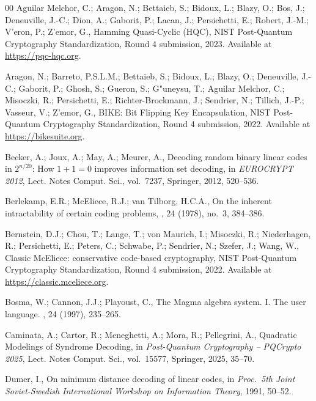 \documentclass{amsart}
\begin{document}
\begin{thebibliography}{00}
Aguilar Melchor, C.; Aragon, N.; Bettaieb, S.; Bidoux, L.; Blazy, O.; Bos, J.;
Deneuville, J.-C.; Dion, A.; Gaborit, P.; Lacan, J.; Persichetti, E.;
Robert, J.-M.; V'eron, P.; Z'emor, G.,
\newblock Hamming Quasi-Cyclic (HQC),
\newblock NIST Post-Quantum Cryptography Standardization, Round 4
submission, 2023.
\newblock Available at \url{https://pqc-hqc.org}.

Aragon, N.; Barreto, P.S.L.M.; Bettaieb, S.; Bidoux, L.; Blazy, O.;
Deneuville, J.-C.; Gaborit, P.; Ghosh, S.; Gueron, S.; G"uneysu, T.;
Aguilar Melchor, C.; Misoczki, R.; Persichetti, E.; Richter-Brockmann, J.;
Sendrier, N.; Tillich, J.-P.; Vasseur, V.; Z'emor, G.,
\newblock BIKE: Bit Flipping Key Encapsulation,
\newblock NIST Post-Quantum Cryptography Standardization, Round 4
submission, 2022.
\newblock Available at \url{https://bikesuite.org}.

Becker, A.; Joux, A.; May, A.; Meurer, A.,
\newblock Decoding random binary linear codes in $2^{n/20}$: How $1+1=0$
improves information set decoding,
\newblock in {\em EUROCRYPT 2012}, Lect. Notes Comput. Sci.,
vol.~7237, Springer, 2012, 520--536.

Berlekamp, E.R.; McEliece, R.J.; van Tilborg, H.C.A.,
\newblock On the inherent intractability of certain coding problems,
, 24 (1978), no.~3, 384--386.

Bernstein, D.J.; Chou, T.; Lange, T.; von Maurich, I.; Misoczki, R.;
Niederhagen, R.; Persichetti, E.; Peters, C.; Schwabe, P.; Sendrier, N.;
Szefer, J.; Wang, W.,
\newblock Classic McEliece: conservative code-based cryptography,
\newblock NIST Post-Quantum Cryptography Standardization, Round 4
submission, 2022.
\newblock Available at \url{https://classic.mceliece.org}.

Bosma, W.; Cannon, J.J.; Playoust, C.,
\newblock The Magma algebra system. I. The user language.
, 24 (1997), 235--265.

Caminata, A.; Cartor, R.; Meneghetti, A.; Mora, R.; Pellegrini, A.,
\newblock Quadratic Modelings of Syndrome Decoding,
\newblock in {\em Post-Quantum Cryptography -- PQCrypto 2025},
Lect. Notes Comput. Sci., vol.~15577, Springer, 2025, 35--70.

Dumer, I.,
\newblock On minimum distance decoding of linear codes,
\newblock in {\em Proc.\ 5th Joint Soviet-Swedish International Workshop on
Information Theory}, 1991, 50--52.


\end{thebibliography}
\end{document}
